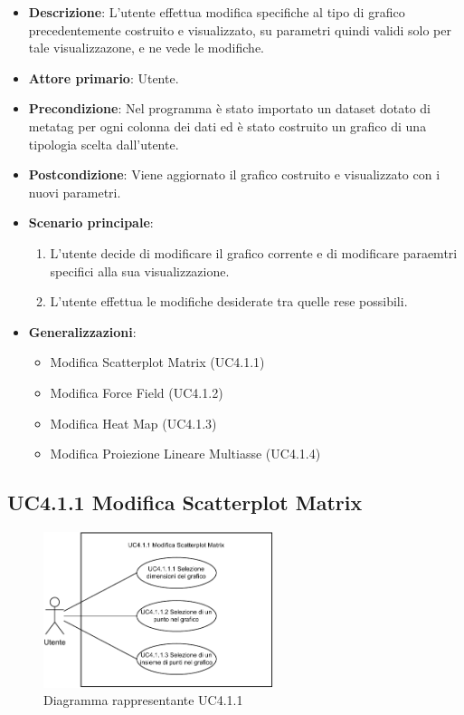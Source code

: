 \begin{itemize}
    \item \textbf{Descrizione}: L’utente effettua modifica specifiche al tipo di grafico precedentemente costruito e visualizzato, 
                                su parametri quindi validi solo per tale visualizzazone, e ne vede le modifiche.
	
    \item \textbf{Attore primario}: Utente.
    
    \item \textbf{Precondizione}:   Nel programma è stato importato un dataset dotato di metatag per ogni
                                    colonna dei dati ed è stato costruito un grafico di una tipologia scelta dall'utente.

    \item \textbf{Postcondizione}:  Viene aggiornato il grafico costruito e visualizzato con i nuovi parametri.

	\item \textbf{Scenario principale}:
		\begin{enumerate}
			\item L'utente decide di modificare il grafico corrente e di modificare paraemtri specifici alla sua visualizzazione.
			\item L'utente effettua le modifiche desiderate tra quelle rese possibili.
        \end{enumerate}
    \item \textbf{Generalizzazioni}:
        \begin{itemize}
            \item Modifica Scatterplot Matrix (UC4.1.1)
            \item Modifica Force Field (UC4.1.2)
            \item Modifica Heat Map (UC4.1.3)
            \item Modifica Proiezione Lineare Multiasse (UC4.1.4)
        \end{itemize}

\end{itemize}


\newpage
\subsection{UC4.1.1 Modifica Scatterplot Matrix}
\label{subsec:uc4.1}

\begin{figure}[h]
    \centering
    \includegraphics[width=0.6\textwidth]{componenti/casi-duso/diagrammi/UC4.1.1.pdf}
    \caption{Diagramma rappresentante UC4.1.1}
    \label{fig:UC2}
\end{figure}


